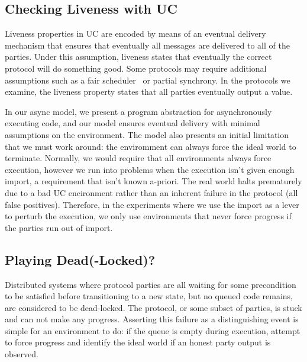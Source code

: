 
\subsection{Checking Liveness with UC}
Liveness properties in UC are encoded by means of an eventual delivery
mechanism that ensures that eventually all messages are delivered to all of the
parties.  Under this assumption, liveness states that eventually the correct
protocol will do something good.  Some protocols may require additional
assumptions such as a fair scheduler~\cite{mmr} or partial synchrony.  In the
protocols we examine, the liveness property states that all parties eventually
output a value.

In our async model, we present a program abstraction for asynchronously
executing code, and our model ensures eventual delivery with minimal
assumptions on the environment.  The model also presents an initial limitation
that we must work around: the enviromment can always force the ideal world to
terminate.  Normally, we would require that all environments always force
execution, however we run into problems when the execution isn't given enough
import, a requirement that isn't known a-priori.  The real world halts
prematurely due to a bad UC encironment rather than an inherent failure in the
protocol (all false positives).  Therefore, in the experiments where we use the
import as a lever to perturb the execution, we only use environments that never
force progress if the parties run out of import.

\subsection{Playing Dead(-Locked)?}
Distributed systems where protocol parties are all waiting for some
precondition to be satisfied before transitioning to a new state, but no queued
code remains, are considered to be dead-locked.  The protocol, or some subset
of parties, is stuck and can not make any progress.  Asserting this failure as
a distinguishing event is simple for an environment to do: if the queue is
empty during execution, attempt to force progress and identify the ideal world
if an honest party output is observed.

